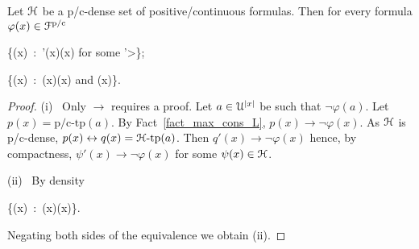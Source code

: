 \documentclass{amsproc}
\renewcommand*{\emph}[1]{%
   \smash{\tikz[baseline]\node[rectangle, fill=teal!25, rounded corners, inner xsep=0.5ex, inner ysep=0.2ex, anchor=base, minimum height = 2.7ex]{\strut #1};}}
\begin{document}
{\begin{proposition}\label{prop_Fapprox}
  Let ${\EuScript H}$ be a p/c-dense set of positive/continuous formulas.
  Then for every formula $\varphi(x)\in{\EuScript F}^{\rm p/c}$
  
  {\leftrightarrow}
  {\bigvee\big\{\psi(x)\ :\  \psi'(x)\rightarrow\neg\varphi(x)\textrm{ for some }\psi'>\psi\big\};}

  {\leftrightarrow}
  {\bigvee\big\{\neg\psi(x)\ :\ \neg\psi(x)\rightarrow\neg\varphi(x)\textrm{ and }\psi(x)\big\}.}

\end{proposition}
 
\begin{proof} 
  (i) \ Only $\rightarrow$ requires a proof.
  Let $a\in {\EuScript U}^{|x|}$ be such that $\neg\varphi(a)$.
  Let $p(x)=\mbox{p/c-tp}(a)$.
  By Fact~\ref{fact_max_cons_L}, $p(x)\rightarrow\neg\varphi(x)$.
  As ${\EuScript H}$ is p/c-dense, $p(x)\leftrightarrow q(x)={\EuScript H}\mbox{-tp}(a)$.
  Then $q'(x)\rightarrow\neg\varphi(x)$ hence, by compactness, $\psi'(x)\rightarrow\neg\varphi(x)$ for some $\psi(x)\in{\EuScript H}$.

  (ii) \ By density

  {\leftrightarrow}
  {\bigwedge\big\{\psi(x)\ :\ \varphi(x)\rightarrow\psi(x)\big\}.}
  
  Negating both sides of the equivalence we obtain (ii).
\end{proof}


\begin{comment}
\section{Elimination of quantifiers of sort \textsf{S} for positive formulas}\label{Ielimination}

We write \emph{${\EuScript F}^{\rm p/c}_{{\sf S}{\rm qf}}$} for the set of positive/continuous formulas without quantifiers of sort ${\sf S}$.

In this section we show that ${\EuScript F}^{\rm p}_{{\sf S}{\rm qf}}$ is p-dense modulo $T$ (the theory of ${\EuScript U}$).
In plain words, this amounts to the elimination of the quantifiers of sort ${\sf S}$ up to some approximation.
In Section~\ref{cIelimination} we prove the analogous result for ${\EuScript F}^{\rm c}_{{\sf S}{\rm qf}}$.


\end{comment}}
\end{document}
